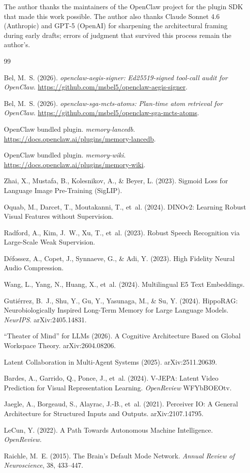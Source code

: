 \documentclass[11pt]{article}
\begin{document}
The author thanks the maintainers of the OpenClaw project for
the plugin SDK that made this work possible. The author also
thanks Claude Sonnet 4.6 (Anthropic) and GPT-5 (OpenAI) for
sharpening the architectural framing during early drafts;
errors of judgment that survived this process remain the
author's.

\begin{thebibliography}{99}

Bel, M.~S. (2026).
\emph{openclaw-aegis-signer: Ed25519-signed tool-call audit for OpenClaw}.
\url{https://github.com/msbel5/openclaw-aegis-signer}.

Bel, M.~S. (2026).
\emph{openclaw-sga-mcts-atoms: Plan-time atom retrieval for OpenClaw}.
\url{https://github.com/msbel5/openclaw-sga-mcts-atoms}.

OpenClaw bundled plugin. \emph{memory-lancedb}.
\url{https://docs.openclaw.ai/plugins/memory-lancedb}.

OpenClaw bundled plugin. \emph{memory-wiki}.
\url{https://docs.openclaw.ai/plugins/memory-wiki}.

Zhai, X., Mustafa, B., Kolesnikov, A., \& Beyer, L. (2023).
Sigmoid Loss for Language Image Pre-Training (SigLIP).

Oquab, M., Darcet, T., Moutakanni, T., et~al. (2024).
DINOv2: Learning Robust Visual Features without Supervision.

Radford, A., Kim, J.~W., Xu, T., et~al. (2023).
Robust Speech Recognition via Large-Scale Weak Supervision.

Défossez, A., Copet, J., Synnaeve, G., \& Adi, Y. (2023).
High Fidelity Neural Audio Compression.

Wang, L., Yang, N., Huang, X., et~al. (2024).
Multilingual E5 Text Embeddings.

Gutiérrez, B.~J., Shu, Y., Gu, Y., Yasunaga, M., \& Su, Y. (2024).
HippoRAG: Neurobiologically Inspired Long-Term Memory for Large
Language Models.
\emph{NeurIPS}.
arXiv:2405.14831.

``Theater of Mind'' for LLMs (2026).
A Cognitive Architecture Based on Global Workspace Theory.
arXiv:2604.08206.

Latent Collaboration in Multi-Agent Systems (2025).
arXiv:2511.20639.

Bardes, A., Garrido, Q., Ponce, J., et~al. (2024).
V-JEPA: Latent Video Prediction for Visual Representation Learning.
\emph{OpenReview} WFYbBOEOtv.

Jaegle, A., Borgeaud, S., Alayrac, J.-B., et~al. (2021).
Perceiver IO: A General Architecture for Structured Inputs and Outputs.
arXiv:2107.14795.

LeCun, Y. (2022).
A Path Towards Autonomous Machine Intelligence.
\emph{OpenReview}.

Raichle, M.~E. (2015).
The Brain's Default Mode Network.
\emph{Annual Review of Neuroscience}, 38, 433--447.

\end{thebibliography}
\end{document}
